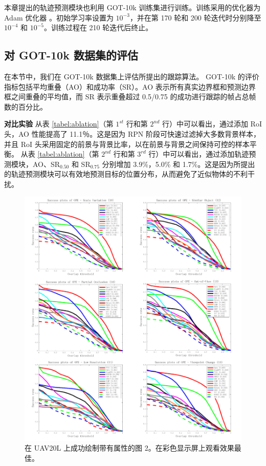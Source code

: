 本章提出的轨迹预测模块也利用 GOT-10k 训练集进行训练。训练采用的优化器为 Adam 优化器 \cite{kingma2014adam}。初始学习率设置为 $10^{-3}$，并在第 170 轮和 200 轮迭代时分别降至 $10^{-4}$ 和 $10^{-5}$。训练过程在 210 轮迭代后终止。

\subsection{对 GOT-10k 数据集的评估}
在本节中，我们在 GOT-10k \cite{GOT-10k} 数据集上评估所提出的跟踪算法。
GOT-10k 的评价指标包括平均重叠（AO）和成功率（SR）。AO 表示所有真实边界框和预测边界框之间重叠的平均值，而 SR 表示重叠超过 0.5/0.75 的成功进行跟踪的帧占总帧数的百分比。

\textbf{对比实验}
从表 \ref{tabel:ablation}（第 $1^{st}$ 行和第 $2^{nd}$ 行）中可以看出，通过添加 RoI 头，AO 性能提高了 11.1％。这是因为 RPN 阶段可快速过滤掉大多数背景样本，并且 RoI 头采用固定的前景与背景比率，以在前景与背景之间保持可控的样本平衡。
从表 \ref{tabel:ablation}（第 $2^{nd}$ 行和第 $3^{rd}$ 行）中可以看出，通过添加轨迹预测模块，AO、SR$_{0.50}$ 和 SR$_{0.75}$ 分别增加 3.9\%，5.0\% 和 1.7\%。这是因为所提出的轨迹预测模块可以有效地预测目标的位置分布，从而避免了近似物体的不利干扰。

\begin{figure}[t!]
\centering
\includegraphics[width=1.0\textwidth]{Img/globally/UAV20L_2.pdf}
\caption{在 UAV20L 上成功绘制带有属性的图 2。在彩色显示屏上观看效果最佳。}
\end{figure}

